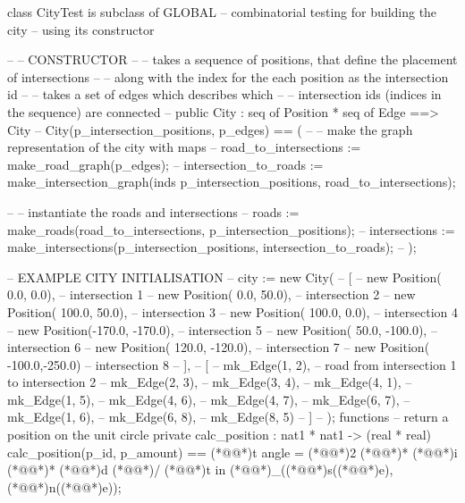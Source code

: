 \documentclass[a4paper]{article}
\begin{document}
\title{}
\author{}
\begin{vdm_al}
class CityTest is subclass of GLOBAL
-- combinatorial testing for building the city
-- using its constructor

-- -- CONSTRUCTOR
-- -- takes a sequence of positions, that define the placement of intersections
-- -- along with the index for the each position as the intersection id
-- -- takes a set of edges which describes which
-- -- intersection ids (indices in the sequence) are connected
-- public City : seq of Position * seq of Edge ==> City
-- City(p_intersection_positions, p_edges) == (
--     -- make the graph representation of the city with maps
--     road_to_intersections := make_road_graph(p_edges);
--     intersection_to_roads := make_intersection_graph(inds p_intersection_positions, road_to_intersections);
    
--     -- instantiate the roads and intersections
--     roads := make_roads(road_to_intersections, p_intersection_positions);
--     intersections := make_intersections(p_intersection_positions, intersection_to_roads);
-- );

-- EXAMPLE CITY INITIALISATION
-- city := new City(
--     [
--         new Position(   0.0,    0.0), -- intersection 1
--         new Position(   0.0,   50.0), -- intersection 2
--         new Position( 100.0,   50.0), -- intersection 3
--         new Position( 100.0,    0.0), -- intersection 4
--         new Position(-170.0, -170.0), -- intersection 5
--         new Position(  50.0, -100.0), -- intersection 6
--         new Position( 120.0, -120.0), -- intersection 7
--         new Position( -100.0,-250.0)  -- intersection 8
--     ],
--     [
--         mk_Edge(1, 2), -- road from intersection 1 to intersection 2
--         mk_Edge(2, 3),
--         mk_Edge(3, 4),
--         mk_Edge(4, 1),
--         mk_Edge(1, 5),
--         mk_Edge(4, 6),
--         mk_Edge(4, 7),
--         mk_Edge(6, 7),
--         mk_Edge(1, 6),
--         mk_Edge(6, 8),
--         mk_Edge(8, 5)
--     ]
-- );
functions
    -- return a position on the unit circle
    private calc_position : nat1 * nat1 -> (real * real)
    calc_position(p_id, p_amount) ==
        (*@@*)t angle = (*@\vdmnotcovered{}@*)2 (*@\vdmnotcovered{}@*)* (*@@*)i (*@\vdmnotcovered{}@*)* (*@@*)d (*@\vdmnotcovered{}@*)/ (*@@*)t in
            (*@@*)_((*@@*)s((*@@*)e), (*@@*)n((*@@*)e));
    

\end{vdm_al}
\end{document}
